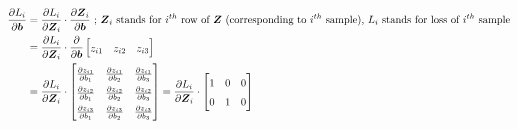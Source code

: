 \documentclass{article}
\begin{document}
\begin{subequations}
    \begin{equation}
        \renewcommand*{\arraystretch}{1.5}
        \begin{aligned}[t]
            \frac{\partial L_{i}}{\partial \boldsymbol{b}} &= \frac{\partial L_{i}}{\partial \boldsymbol{Z}_{i}} \cdot \frac{\partial \boldsymbol{Z}_{i}}{\partial \boldsymbol{b}} \text{ ; $\boldsymbol{Z}_{i}$ stands for $i^{th}$ row of $\boldsymbol{Z}$ (corresponding to $i^{th}$ sample), $L_{i}$ stands for loss of $i^{th}$ sample}\\
                                                           &= \frac{\partial L_{i}}{\partial \boldsymbol{Z}_{i}} \cdot \frac{\partial}{\partial \boldsymbol{b}}
                                                                   \begin{bmatrix}
                                                                       z_{i1} & z_{i2} & z_{i3}
                                                                   \end{bmatrix}\\
                                                           &= \frac{\partial L_{i}}{\partial \boldsymbol{Z}_{i}} \cdot 
                                                                   \begin{bmatrix}
                                                                       \frac{\partial z_{i1}}{\partial b_{1}} & \frac{\partial z_{i1}}{\partial b_{2}} & \frac{\partial z_{i1}}{\partial b_{3}}\\
                                                                       \frac{\partial z_{i2}}{\partial b_{1}} & \frac{\partial z_{i2}}{\partial b_{2}} & \frac{\partial z_{i2}}{\partial b_{3}}\\
                                                                       \frac{\partial z_{i3}}{\partial b_{1}} & \frac{\partial z_{i3}}{\partial b_{2}} & \frac{\partial z_{i3}}{\partial b_{3}}\\
                                                                   \end{bmatrix}
                                                               = \frac{\partial L_{i}}{\partial \boldsymbol{Z}_{i}} \cdot 
                                                                   \begin{bmatrix}
                                                                       1 & 0 & 0\\
                                                                       0 & 1 & 0\\

\end{bmatrix}
\end{aligned}
\end{equation}
\end{subequations}
\end{document}
